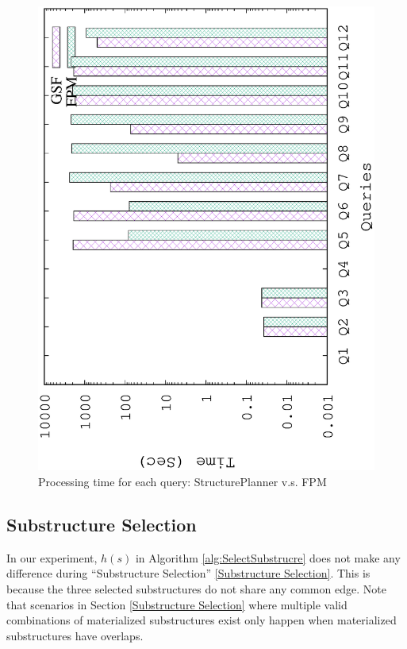 \begin{figure}[H]
	\centering
	\includegraphics[scale=0.5, angle=270]{plot/qfpm.eps}
	\caption{Processing time for each query: StructurePlanner v.s. FPM}
	\label{fig:qfpm}
\end{figure}


\subsection{Substructure Selection}
\label{exp:Substructure Selection}

In our experiment, $h(s)$ in Algorithm \ref{alg:SelectSubstrucre} does not make any difference during ``Substructure Selection'' \ref{Substructure Selection}. This is because the three selected substructures do not share any common edge. Note that scenarios in Section \ref{Substructure Selection} where multiple valid combinations of materialized substructures exist only happen when materialized substructures have overlaps.


